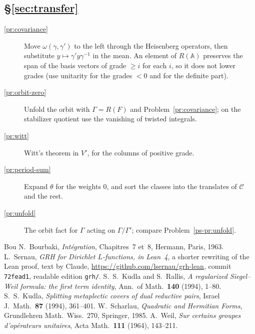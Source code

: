 \documentclass[reqno]{amsart}
\theoremstyle{definition}
\theoremstyle{plain}
\theoremstyle{remark}
\newcommand{\A}{\mathbb{A}}
\newcommand{\Cc}{\mathcal{C}}
\begin{document}
\subsection*{\S\ref{sec:transfer}}
\begin{description}
\item[\ref{pr:covariance}] Move \(\omega(\gamma,\gamma')\) to the left through the Heisenberg operators, then substitute \(y\mapsto\gamma'y\gamma^{-1}\) in the mean.  An element of \(R(\A)\) preserves the span of the basis vectors of grade \(\ge i\) for each \(i\), so it does not lower grades (use unitarity for the grades \(<0\) and for the definite part).
\item[\ref{pr:orbit-zero}] Unfold the orbit with \(\Gamma=R(F)\) and Problem~\ref{pr:covariance}; on the stabilizer quotient use the vanishing of twisted integrals.
\item[\ref{pr:witt}] Witt's theorem in \(V'\), for the columns of positive grade.
\item[\ref{pr:period-sum}] Expand \(\theta\) for the weights \(0\), and sort the classes into the translates of \(\Cc\) and the rest.
\item[\ref{pr:unfold}] The orbit fact for \(\Gamma\) acting on \(\Gamma/\Gamma'\); compare Problem~\ref{ps-pr:unfold}.
\end{description}

\begin{thebibliography}{Bou}
 N.~Bourbaki, \emph{Int\'egration}, Chapitres~7 et~8, Hermann, Paris, 1963.
 L.~Sernau, \emph{GRH for Dirichlet \(L\)-functions, in Lean~4}, a shorter rewriting of the Lean proof, text by Claude, \url{https://github.com/lsernau/grh-lean}, commit \texttt{72fead1}, readable edition \texttt{grh/}.
 S.~S.~Kudla and S.~Rallis, \emph{A regularized Siegel--Weil formula: the first term identity}, Ann.\ of Math.\ \textbf{140} (1994), 1--80.
 S.~S.~Kudla, \emph{Splitting metaplectic covers of dual reductive pairs}, Israel J.\ Math.\ \textbf{87} (1994), 361--401.
 W.~Scharlau, \emph{Quadratic and Hermitian Forms}, Grundlehren Math.\ Wiss.\ 270, Springer, 1985.
 A.~Weil, \emph{Sur certains groupes d'op\'erateurs unitaires}, Acta Math.\ \textbf{111} (1964), 143--211.
\end{thebibliography}
\end{document}

